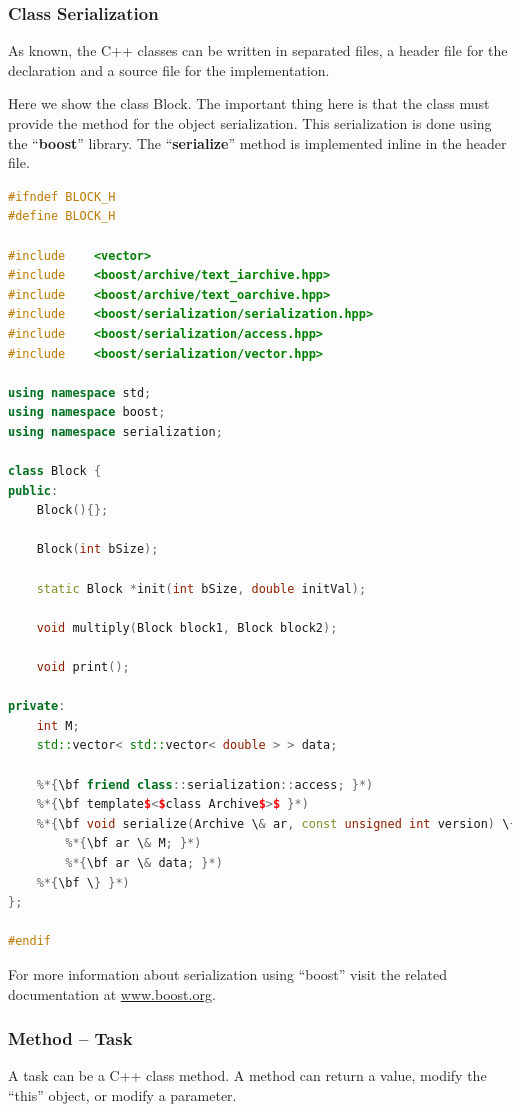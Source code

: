 \subsubsection{Class Serialization}
As known, the C++ classes can be written in separated files, a header file for the declaration and a source file for the implementation.

Here we show the class Block. The important thing here is that the class must provide the method for the object serialization. 
This serialization is done using the ``{\bf boost}'' library. The ``{\bf serialize}'' method is implemented inline in the header file.

\begin{lstlisting}[language=C++]
#ifndef BLOCK_H
#define BLOCK_H

#include    <vector>
#include    <boost/archive/text_iarchive.hpp>
#include    <boost/archive/text_oarchive.hpp>
#include    <boost/serialization/serialization.hpp>
#include    <boost/serialization/access.hpp>
#include    <boost/serialization/vector.hpp>

using namespace std;
using namespace boost;
using namespace serialization;

class Block {
public:
    Block(){};

    Block(int bSize);
       
    static Block *init(int bSize, double initVal);
        
    void multiply(Block block1, Block block2);
        
    void print();

private:
    int M;
    std::vector< std::vector< double > > data;
        
    %*{\bf friend class::serialization::access; }*)
    %*{\bf template$<$class Archive$>$ }*)
    %*{\bf void serialize(Archive \& ar, const unsigned int version) \{ }*)
        %*{\bf ar \& M; }*)
        %*{\bf ar \& data; }*)
    %*{\bf \} }*)
};

#endif
\end{lstlisting}

For more information about serialization using ``boost'' visit the related documentation at \url{www.boost.org}.


\subsubsection{Method – Task}

A task can be a C++ class method. A method can return a value, modify the “this” object, or modify a parameter.

